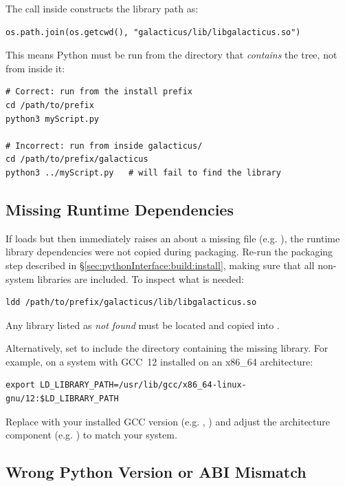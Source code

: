The  call inside  constructs the library path as:
\begin{verbatim}
os.path.join(os.getcwd(), "galacticus/lib/libgalacticus.so")
\end{verbatim}
This means Python must be run from the directory that \emph{contains} the  tree, not from inside it:
\begin{verbatim}
# Correct: run from the install prefix
cd /path/to/prefix
python3 myScript.py

# Incorrect: run from inside galacticus/
cd /path/to/prefix/galacticus
python3 ../myScript.py   # will fail to find the library
\end{verbatim}

\subsection{Missing Runtime Dependencies}\label{sec:pythonInterface:troubleshooting:deps}

If  loads but then immediately raises an  about a missing  file (e.g. ), the runtime library dependencies were not copied during packaging. Re-run the packaging step described in \S\ref{sec:pythonInterface:build:install}, making sure that all non-system libraries are included. To inspect what is needed:
\begin{verbatim}
ldd /path/to/prefix/galacticus/lib/libgalacticus.so
\end{verbatim}
Any library listed as \emph{not found} must be located and copied into .

Alternatively, set  to include the directory containing the missing library. For example, on a system with GCC~12 installed on an x86\_64 architecture:
\begin{verbatim}
export LD_LIBRARY_PATH=/usr/lib/gcc/x86_64-linux-gnu/12:$LD_LIBRARY_PATH
\end{verbatim}
Replace  with your installed GCC version (e.g. , ) and adjust the architecture component (e.g. ) to match your system.

\subsection{Wrong Python Version or ABI Mismatch}\label{sec:pythonInterface:troubleshooting:abi}


